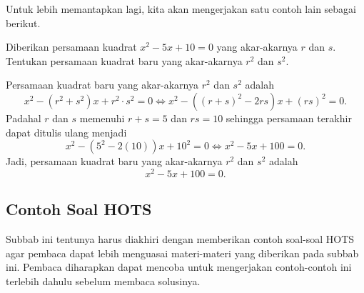 	\par Untuk lebih memantapkan lagi, kita akan mengerjakan satu contoh lain sebagai berikut.
	
	\begin{contoh}
		Diberikan persamaan kuadrat $ x^{2} - 5x + 10 = 0 $ yang akar-akarnya $ r $ dan $ s $. Tentukan persamaan kuadrat baru yang akar-akarnya $ r^{2} $ dan $ s^{2} $.
	\end{contoh}
	\begin{jawab}
		Persamaan kuadrat baru yang akar-akarnya $ r^{2} $ dan $ s^{2} $ adalah
		\[ x^{2} - \left(r^{2} + s^{2}\right)x + r^{2} \cdot s^{2} = 0 \iff x^{2} - \left(\left(r + s\right)^{2} - 2rs\right)x + \left(rs\right)^{2} = 0. \]
		Padahal $ r $ dan $ s $ memenuhi $ r + s = 5 $ dan $ rs = 10 $ sehingga persamaan terakhir dapat ditulis ulang menjadi
		\[ x^{2} - \left(5^{2} - 2\left(10\right)\right)x + 10^{2} = 0 \iff x^{2} - 5x + 100 = 0. \]
		Jadi, persamaan kuadrat baru yang akar-akarnya $ r^{2} $ dan $ s^{2} $ adalah
		\[ x^{2} - 5x + 100 = 0. \]
	\end{jawab}

\subsection{Contoh Soal HOTS}
	
	Subbab ini tentunya harus diakhiri dengan memberikan contoh soal-soal HOTS agar pembaca dapat lebih menguasai materi-materi yang diberikan pada subbab ini. Pembaca diharapkan dapat mencoba untuk mengerjakan contoh-contoh ini terlebih dahulu sebelum membaca solusinya.
	
